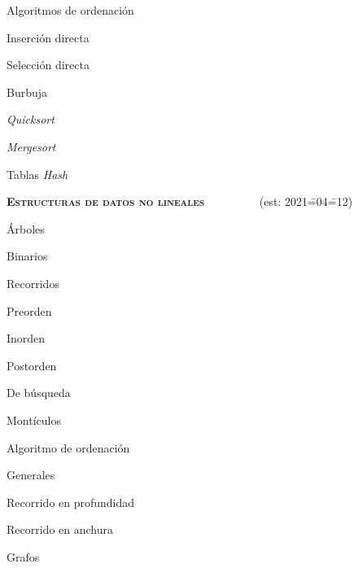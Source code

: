 \begin{longenum}
\begin{longenum}
        \item Algoritmos de ordenación
        \begin{longenum}
            \item Inserción directa
            \item Selección directa
            \item Burbuja
            \item \textit{Quicksort}
            \item \textit{Mergesort}
        \end{longenum}
        \item Tablas \textit{Hash}
    \end{longenum}
    \item \textbf{\textsc{Estructuras de datos no lineales}} \ \ \ \ \ \ \ \ \ (est: 2021\==04\==12)
    \begin{longenum}
        \item Árboles
        \begin{longenum}
            \item Binarios
            \begin{longenum}
                \item Recorridos
                \begin{longenum}
                    \item Preorden
                    \item Inorden
                    \item Postorden
                \end{longenum}
            \end{longenum}
            \item De búsqueda
            \item Montículos
            \begin{longenum}
                \item Algoritmo de ordenación
            \end{longenum}
            \item Generales
            \begin{longenum}
                \item Recorrido en profundidad
                \item Recorrido en anchura
            \end{longenum}
        \end{longenum}
        \item Grafos
        \begin{longenum}

\end{longenum}
\end{longenum}
\end{longenum}
